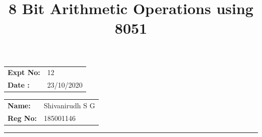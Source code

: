 \documentclass[12pt,a4paper]{article}
\title{\bf 8 Bit Arithmetic Operations using 8051}
\author{\vspace{-10ex}}
\date{\vspace{-10ex}}
\begin{document}
\maketitle

\begin{minipage}{0.45\textwidth}
        \begin{tabular}{l l}
            \textbf{Expt No:}&12\\
            \textbf{Date :}&23/10/2020
        \end{tabular}
\end{minipage}%
\begin{minipage}{0.45\textwidth}
        \begin{tabular}{l l}
             \textbf{Name:}& Shivanirudh S G  \\
             \textbf{Reg No:} & 185001146 
        \end{tabular}
\end{minipage}
\vspace{1cm}
\hrule
\end{document}
